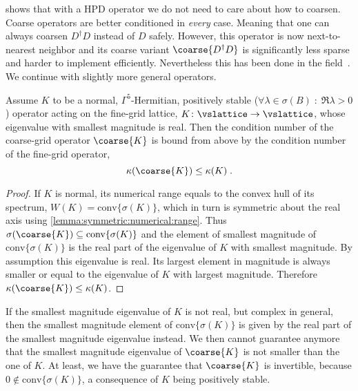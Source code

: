  shows that with a HPD operator we do not need to care about how to coarsen.
Coarse operators are better conditioned in \emph{every} case.
Meaning that one can always coarsen $D^{\dagger} D$ instead of $D$ safely.
However, this operator is now next-to-nearest neighbor and its coarse variant $\coarse{D^{\dagger} D}$ is significantly less sparse and harder to implement efficiently.
Nevertheless this has been done in the field~\cite{Cohen:2011ivh,Boyle:2014rwa}.
We continue with slightly more general operators.

\begin{theorem} \label{thm:cond:normal:pos:stable}
Assume $K$ to be a normal, $\Gamma^{5}$-Hermitian, positively stable ($\forall \lambda \in \sigma(B) \; : \; \Re{\lambda} > 0$) operator acting on the fine-grid lattice, $K \colon \vslattice \rightarrow \vslattice$, whose eigenvalue with smallest magnitude is real.
Then the condition number of the coarse-grid operator $\coarse{K}$ is bound from above by the condition number of the fine-grid operator,
\begin{equation}
\kappa(\coarse{K}) \leq \kappa(K) \;.
\end{equation}
\end{theorem}

\begin{proof}
If $K$ is normal, its numerical range equals to the convex hull of its spectrum, $W(K) = \text{conv}\{\sigma(K)\}$, which in turn is symmetric about the real axis using \cref{lemma:symmetric:numerical:range}.
Thus $\sigma(\coarse{K}) \subseteq \text{conv}\{\sigma(K)\}$ and the element of smallest magnitude of $\text{conv}\{\sigma(K)\}$ is the real part of the eigenvalue of $K$ with smallest magnitude.
By assumption this eigenvalue is real.
Its largest element in magnitude is always smaller or equal to the eigenvalue of $K$ with largest magnitude.
Therefore $\kappa(\coarse{K}) \leq \kappa(K)$.
\end{proof}

If the smallest magnitude eigenvalue of $K$ is not real, but complex in general, then the smallest magnitude element of $\text{conv}\{\sigma(K)\}$ is given by the real part of the smallest magnitude eigenvalue instead.
We then cannot guarantee anymore that the smallest magnitude eigenvalue of $\coarse{K}$ is not smaller than the one of $K$.
At least, we have the guarantee that $\coarse{K}$ is invertible, because $0 \not\in \text{conv}\{\sigma(K)\}$, a consequence of $K$ being positively stable.

